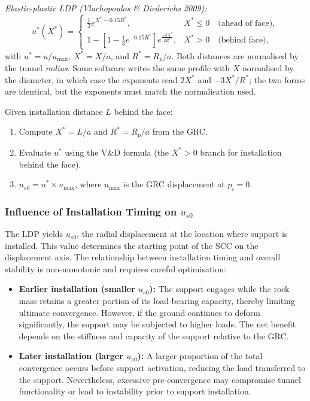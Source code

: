 \documentclass[a4paper,12pt]{article}
\begin{document}
\textit{Elastic-plastic LDP (Vlachopoulos \& Diederichs 2009):}
\[
u^*(X^*) =
\begin{cases}
\frac{1}{3} e^{X^* - 0.15R^*}, & X^* \leq 0 \quad \text{(ahead of face)},\\[4pt]
1 - \left[1 - \frac{1}{3} e^{-0.15R^*}\right] e^{\frac{-3X^*}{2R^*}}, & X^* > 0 \quad \text{(behind face)},
\end{cases}
\]
with $u^* = u/u_{\max}$, $X^* = X/a$, and $R^* = R_p/a$. Both distances are normalised by the tunnel \emph{radius}. Some software writes the same profile with $X$ normalised by the diameter, in which case the exponents read $2X^*$ and $-3X^*/R^*$; the two forms are identical, but the exponents must match the normalisation used.

\begin{notebox}
Given installation distance $L$ behind the face:
\begin{enumerate}[nosep]
\item Compute $X^* = L/a$ and $R^* = R_p/a$ from the GRC.
\item Evaluate $u^*$ using the V\&D formula (the $X^*>0$ branch for installation behind the face).
\item $u_{s0} = u^* \times u_{\max}$, where $u_{\max}$ is the GRC displacement at $p_i = 0$.
\end{enumerate}
\end{notebox}

\subsubsection{Influence of Installation Timing on $u_{s0}$}
The LDP yields $u_{s0}$, the radial displacement at the location where support is installed. This value determines the starting point of the SCC on the displacement axis. The relationship between installation timing and overall stability is non-monotonic and requires careful optimisation:

\begin{itemize}
    \item \textbf{Earlier installation (smaller $u_{s0}$):} The support engages while the rock mass retains a greater portion of its load-bearing capacity, thereby limiting ultimate convergence. However, if the ground continues to deform significantly, the support may be subjected to higher loads. The net benefit depends on the stiffness and capacity of the support relative to the GRC.
    \item \textbf{Later installation (larger $u_{s0}$):} A larger proportion of the total convergence occurs before support activation, reducing the load transferred to the support. Nevertheless, excessive pre-convergence may compromise tunnel functionality or lead to instability prior to support installation.
\end{itemize}
\end{document}
